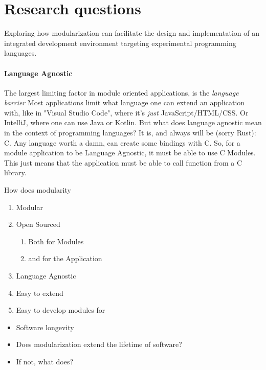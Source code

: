 \section{Research questions}

Exploring how modularization can facilitate the design and implementation of
an integrated development environment targeting experimental programming
languages.




\paragraph{Language Agnostic} The largest limiting factor in module oriented
applications, is the \textit{language barrier} Most applications limit what
language one can extend an application with, like in "Visual Studio Code", where
it's \textit{just} JavaScript/HTML/CSS. Or IntelliJ, where one can use Java or
Kotlin. But what does language agnostic mean in the context of programming
languages? It is, and always will be (sorry Rust): C. Any language worth a damn,
can create some bindings with C. So, for a module application to be Language
Agnostic, it must be able to use C Modules. This just means that the application
must be able to call function from a C library.

How does modularity

\begin{enumerate}
  \item Modular
  \item Open Sourced
    \begin{enumerate}
      \item Both for Modules
      \item and for the Application
    \end{enumerate}
  \item Language Agnostic
  \item Easy to extend
  \item Easy to develop modules for
\end{enumerate}

\begin{itemize}
  \item Software longevity
  \item Does modularization extend the lifetime of software?
  \item If not, what does?
\end{itemize}
